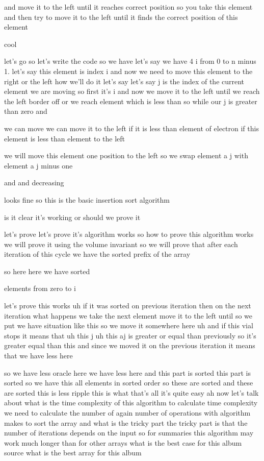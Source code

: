 and move it to the left until it reaches correct position so you take this element and then try to move it to the left until it finds the correct position of this element

cool

let's go so let's write the code so we have let's say we have 4 i from 0 to n minus 1. let's say this element is index i and now we need to move this element to the right or the left how we'll do it let's say let's say j is the index of the current element we are moving so first it's i and now we move it to the left until we reach the left border off or we reach element which is less than so while our j is greater than zero and

we can move we can move it to the left if it is less than element of electron if this element is less than element to the left

we will move this element one position to the left so we swap element a j with element a j minus one

and and decreasing

looks fine so this is the basic insertion sort algorithm

is it clear it's working or should we prove it

let's prove let's prove it's algorithm works so how to prove this algorithm works we will prove it using the volume invariant so we will prove that after each iteration of this cycle we have the sorted prefix of the array

so here here we have sorted

elements from zero to i

let's prove this works uh if it was sorted on previous iteration then on the next iteration what happens we take the next element move it to the left until so we put we have situation like this so we move it somewhere here uh and if this vial stops it means that uh this j uh this aj is greater or equal than previously so it's greater equal than this and since we moved it on the previous iteration it means that we have less here

so we have less oracle here we have less here and this part is sorted this part is sorted so we have this all elements in sorted order so these are sorted and these are sorted this is less ripple this is what that's all it's quite easy ah now let's talk about what is the time complexity of this algorithm to calculate time complexity we need to calculate the number of again number of operations with algorithm makes to sort the array and what is the tricky part the tricky part is that the number of iterations depends on the input so for summaries this algorithm may work much longer than for other arrays what is the best case for this album source what is the best array for this album

